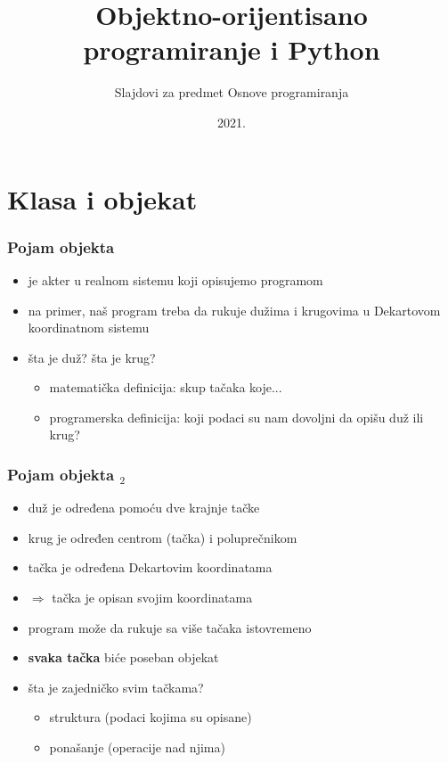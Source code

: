 \documentclass[utf8,compress,aspectratio=169]{beamer}
\title{Objektno-orijentisano programiranje i Python}
\subtitle{\tiny{Slajdovi za predmet Osnove programiranja}}
\institute{Katedra za informatiku, Fakultet tehničkih nauka, Novi Sad}
\date{2021.}
\begin{document}
\expandafter\def\csname PY@tok@err\endcsname{}

\frame{\titlepage}


\section[Klasa i objekat]{Klasa i objekat}

\begin{frame}[fragile]
  \frametitle{Pojam objekta}
  \begin{itemize}
    \item {} je akter u realnom sistemu koji opisujemo programom
    \item na primer, naš program treba da rukuje dužima i krugovima u Dekartovom koordinatnom sistemu
    \item šta je duž? šta je krug?
    \begin{itemize}
      \item matematička definicija: skup tačaka koje...
      \item programerska definicija: koji podaci su nam dovoljni da opišu duž ili krug?
    \end{itemize}
  \end{itemize}
\end{frame}

\begin{frame}[fragile]
  \frametitle{Pojam objekta $_2$}
  \begin{itemize}
    \item duž je određena pomoću dve krajnje tačke
    \item krug je određen centrom (tačka) i poluprečnikom
    \item tačka je određena Dekartovim koordinatama
    \item $\Rightarrow$ tačka je  opisan svojim koordinatama
    \item program može da rukuje sa više tačaka istovremeno
    \item \textbf{svaka tačka} biće poseban objekat
    \item šta je zajedničko svim tačkama?
    \begin{itemize}
      \item struktura (podaci kojima su opisane)
      \item ponašanje (operacije nad njima)
    \end{itemize}
  \end{itemize}
\end{frame}
\end{document}
